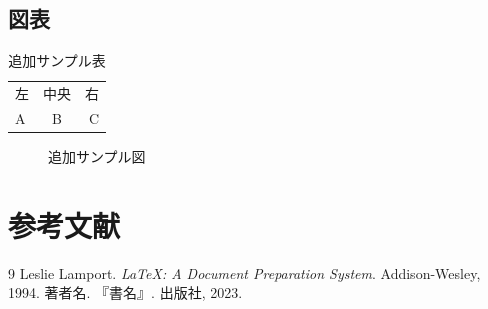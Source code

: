 \documentclass{ltjsarticle}
\theoremstyle{definition}
\begin{document}
\subsection{図表}
\begin{table}[htbp]
  \centering
  \caption{追加サンプル表}
  \begin{tabular}{lcr}
    左 & 中央 & 右 \\
    A & B & C \\
  \end{tabular}
\end{table}
\begin{figure}[htbp]
  \centering
  \fbox{\rule{0pt}{80pt}\rule{120pt}{0pt}}
  \caption{追加サンプル図}
\end{figure}

\section{参考文献}
\begin{thebibliography}{9}
   Leslie Lamport. \textit{\LaTeX: A Document Preparation System}. Addison-Wesley, 1994.
   著者名. 『書名』. 出版社, 2023.
\end{thebibliography}
\end{document}
